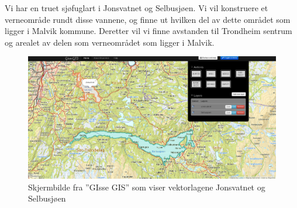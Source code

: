\documentclass[12pt,twoside,onecolumn]{article}
\begin{document}
	Vi har en truet sjøfuglart i Jonsvatnet og Selbusjøen. Vi vil konstruere et verneområde rundt disse vannene, og finne ut hvilken del av dette området som ligger i Malvik kommune. Deretter vil vi finne avstanden til Trondheim sentrum og arealet av delen som verneområdet som ligger i Malvik.
	
	\begin{figure}[h]
		\centering
		\includegraphics[scale=0.3]{gissescreen.png}
		\caption{Skjermbilde fra ''GIsse GIS'' som viser vektorlagene Jonsvatnet og Selbusjøen}
	\end{figure}
	
\end{document}
